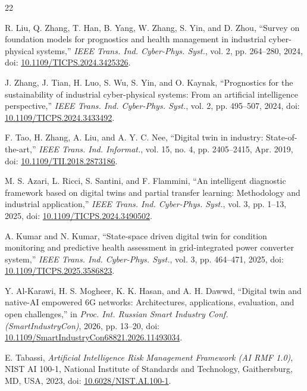 \documentclass[journal]{IEEEtran}
\begin{document}
\begin{thebibliography}{22}

R. Liu, Q. Zhang, T. Han, B. Yang, W. Zhang, S. Yin, and D. Zhou, ``Survey on
foundation models for prognostics and health management in industrial
cyber-physical systems,'' \emph{IEEE Trans. Ind. Cyber-Phys. Syst.}, vol. 2,
pp. 264--280, 2024, doi:
\href{https://doi.org/10.1109/TICPS.2024.3425326}{10.1109/TICPS.2024.3425326}.

J. Zhang, J. Tian, H. Luo, S. Wu, S. Yin, and O. Kaynak, ``Prognostics for
the sustainability of industrial cyber-physical systems: From an artificial
intelligence perspective,'' \emph{IEEE Trans. Ind. Cyber-Phys. Syst.}, vol. 2,
pp. 495--507, 2024, doi:
\href{https://doi.org/10.1109/TICPS.2024.3433492}{10.1109/TICPS.2024.3433492}.

F. Tao, H. Zhang, A. Liu, and A. Y. C. Nee, ``Digital twin in industry:
State-of-the-art,'' \emph{IEEE Trans. Ind. Informat.}, vol. 15, no. 4, pp.
2405--2415, Apr. 2019, doi:
\href{https://doi.org/10.1109/TII.2018.2873186}{10.1109/TII.2018.2873186}.

M. S. Azari, L. Ricci, S. Santini, and F. Flammini, ``An intelligent
diagnostic framework based on digital twins and partial transfer learning:
Methodology and industrial application,'' \emph{IEEE Trans. Ind. Cyber-Phys.
Syst.}, vol. 3, pp. 1--13, 2025, doi:
\href{https://doi.org/10.1109/TICPS.2024.3490502}{10.1109/TICPS.2024.3490502}.

A. Kumar and N. Kumar, ``State-space driven digital twin for condition
monitoring and predictive health assessment in grid-integrated power converter
system,'' \emph{IEEE Trans. Ind. Cyber-Phys. Syst.}, vol. 3, pp. 464--471,
2025, doi:
\href{https://doi.org/10.1109/TICPS.2025.3586823}{10.1109/TICPS.2025.3586823}.

Y. Al-Karawi, H. S. Mogheer, K. K. Hasan, and A. H. Dawwd, ``Digital twin
and native-AI empowered 6G networks: Architectures, applications, evaluation,
and open challenges,'' in \emph{Proc. Int. Russian Smart Industry Conf.
(SmartIndustryCon)}, 2026, pp. 13--20, doi:
\href{https://doi.org/10.1109/SmartIndustryCon68821.2026.11493034}{10.1109/SmartIndustryCon68821.2026.11493034}.

E. Tabassi, \emph{Artificial Intelligence Risk Management Framework (AI RMF
1.0)}, NIST AI 100-1, National Institute of Standards and Technology,
Gaithersburg, MD, USA, 2023, doi:
\href{https://doi.org/10.6028/NIST.AI.100-1}{10.6028/NIST.AI.100-1}.


\end{thebibliography}
\end{document}
